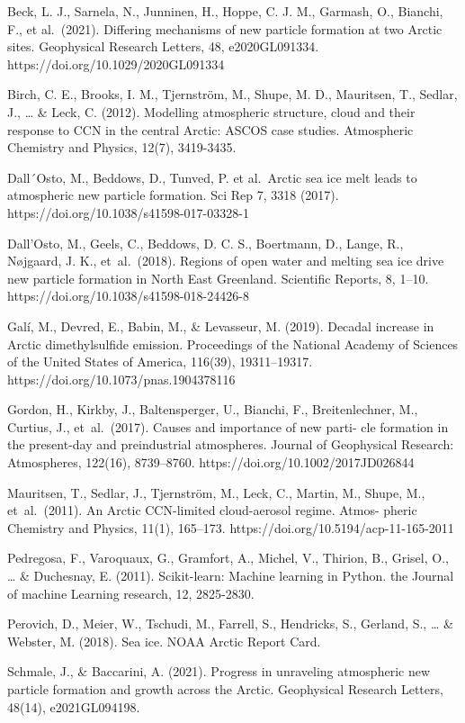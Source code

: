 \documentclass[11pt]{article}
\begin{document}
Beck, L. J., Sarnela, N., Junninen, H., Hoppe, C. J. M., Garmash, O.,
Bianchi, F., et al.~(2021). Differing mechanisms of new particle
formation at two Arctic sites. Geophysical Research Letters, 48,
e2020GL091334. https://doi.org/10.1029/2020GL091334

Birch, C. E., Brooks, I. M., Tjernström, M., Shupe, M. D., Mauritsen,
T., Sedlar, J., \ldots{} \& Leck, C. (2012). Modelling atmospheric
structure, cloud and their response to CCN in the central Arctic: ASCOS
case studies. Atmospheric Chemistry and Physics, 12(7), 3419-3435.

Dall´Osto, M., Beddows, D., Tunved, P. et al.~Arctic sea ice melt leads
to atmospheric new particle formation. Sci Rep 7, 3318 (2017).
https://doi.org/10.1038/s41598-017-03328-1

Dall'Osto, M., Geels, C., Beddows, D. C. S., Boertmann, D., Lange, R.,
Nøjgaard, J. K., et~al.~(2018). Regions of open water and melting sea
ice drive new particle formation in North East Greenland. Scientific
Reports, 8, 1--10. https://doi.org/10.1038/s41598-018-24426-8

Galí, M., Devred, E., Babin, M., \& Levasseur, M. (2019). Decadal
increase in Arctic dimethylsulfide emission. Proceedings of the National
Academy of Sciences of the United States of America, 116(39),
19311--19317. https://doi.org/10.1073/pnas.1904378116

Gordon, H., Kirkby, J., Baltensperger, U., Bianchi, F., Breitenlechner,
M., Curtius, J., et~al.~(2017). Causes and importance of new parti- cle
formation in the present-day and preindustrial atmospheres. Journal of
Geophysical Research: Atmospheres, 122(16), 8739--8760.
https://doi.org/10.1002/2017JD026844

Mauritsen, T., Sedlar, J., Tjernström, M., Leck, C., Martin, M., Shupe,
M., et~al.~(2011). An Arctic CCN-limited cloud-aerosol regime. Atmos-
pheric Chemistry and Physics, 11(1), 165--173.
https://doi.org/10.5194/acp-11-165-2011

Pedregosa, F., Varoquaux, G., Gramfort, A., Michel, V., Thirion, B.,
Grisel, O., \ldots{} \& Duchesnay, E. (2011). Scikit-learn: Machine
learning in Python. the Journal of machine Learning research, 12,
2825-2830.

Perovich, D., Meier, W., Tschudi, M., Farrell, S., Hendricks, S.,
Gerland, S., \ldots{} \& Webster, M. (2018). Sea ice. NOAA Arctic Report
Card.

Schmale, J., \& Baccarini, A. (2021). Progress in unraveling atmospheric
new particle formation and growth across the Arctic. Geophysical
Research Letters, 48(14), e2021GL094198.
\end{document}
